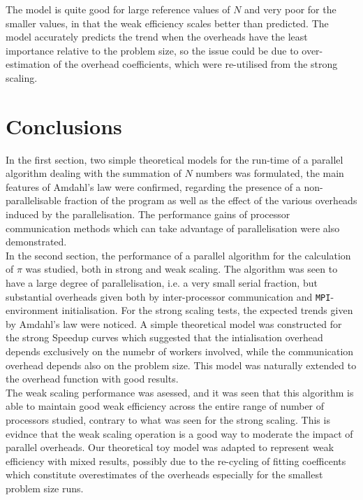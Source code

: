 \documentclass{article}
\begin{document}
The model is quite good for large reference values of $N$ and very poor for the smaller values, in that the weak efficiency scales better than predicted. The model accurately predicts the trend when the overheads have the least importance relative to the problem size, so the issue could be due to over-estimation of the overhead coefficients, which were re-utilised from the strong scaling.

\section{Conclusions}

In the first section, two simple theoretical models for the run-time of a  parallel algorithm dealing with the summation of $N$ numbers was formulated, the main features of Amdahl's law were confirmed, regarding the presence of a non-parallelisable fraction of the program as well as the effect of the various overheads induced by the parallelisation. The performance gains of processor communication methods which can take advantage of parallelisation were also demonstrated.\\
In the second section, the performance of a parallel algorithm for the calculation of $\pi$ was studied, both in strong and weak scaling. The algorithm was seen to have a large degree of parallelisation, i.e. a very small serial fraction, but substantial overheads given both by inter-processor communication and \verb|MPI|-environment initialisation. For the strong scaling tests, the expected trends given by Amdahl's law were noticed. A simple theoretical model was constructed for the strong Speedup curves which suggested that the intialisation overhead depends exclusively on the numebr of workers involved, while the communication overhead depends also on the problem size. This model was naturally extended to the overhead function with good results.\\
The weak scaling performance was asessed, and it was seen that this algorithm is able to maintain good weak efficiency across the entire range of number of processors studied, contrary to what was seen for the strong scaling. This is evidnce that the weak scaling operation is a good way to moderate the impact of parallel overheads. Our theoretical toy model was adapted to represent weak efficiency with mixed results, possibly due to the re-cycling of fitting coefficents which constitute overestimates of the overheads especially for the smallest problem size runs.


%

%

\end{document}
